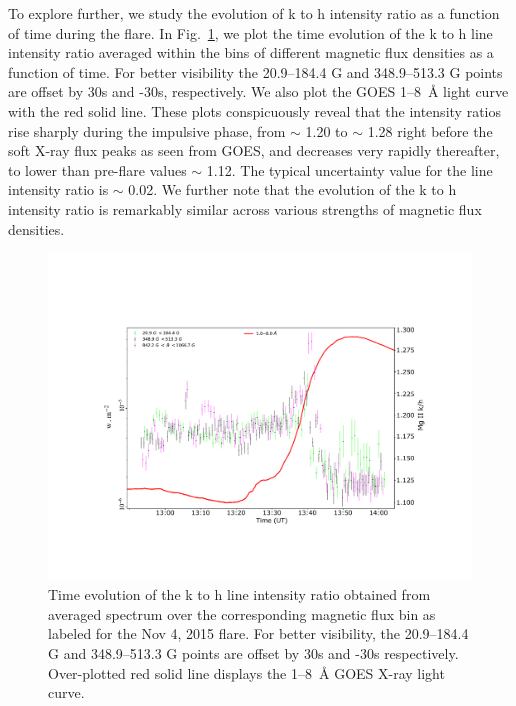 To explore further, we study the evolution of k to h intensity ratio as a function of time during the flare. In Fig.~\ref{fig:optical_dep_ev_m}, we plot the time evolution of the k to h line intensity ratio averaged within the bins of different magnetic flux densities as a function of time. For better visibility the 20.9{--}184.4 G and 348.9{--}513.3 G points are offset by 30s and -30s, respectively. We also plot the GOES 1{--}8~{\AA} light curve with the red solid line. These plots conspicuously reveal that the intensity ratios rise sharply during the impulsive phase, from $\sim$ 1.20 to $\sim$ 1.28 right before the soft X-ray flux peaks as seen from GOES, and decreases very rapidly thereafter, to lower than pre-flare values $\sim$ 1.12. The typical uncertainty value for the line intensity ratio is $\sim$ 0.02. We further note that the evolution of the   k to h intensity ratio is remarkably similar across various strengths of magnetic flux densities.

\begin{figure}[ht!]
    \centering
    \includegraphics[trim={3cm 3cm 2cm 4cm},clip,width=\textwidth]{Figures/Nov-11-2015-optical-dep-ev-5.pdf}
    \caption{Time evolution of the   k to h line intensity ratio obtained from averaged spectrum over the corresponding magnetic flux bin as labeled for the Nov 4, 2015 flare. For better visibility, the 20.9{--}184.4 G and 348.9{--}513.3 G points are offset by 30s and -30s respectively. Over-plotted red solid line displays the 1{--}8~{\AA} GOES X-ray light curve.}
    \label{fig:optical_dep_ev_m}
\end{figure}


